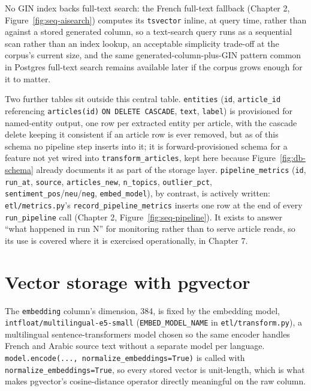 No GIN index backs full-text search: the French full-text fallback (Chapter 2, Figure~\ref{fig:seq-aisearch}) computes its \texttt{tsvector} inline, at query time, rather than against a stored generated column, so a text-search query runs as a sequential scan rather than an index lookup, an acceptable simplicity trade-off at the corpus's current size, and the same generated-column-plus-GIN pattern common in Postgres full-text search remains available later if the corpus grows enough for it to matter.

Two further tables sit outside this central table. \texttt{entities} (\texttt{id}, \texttt{article\_id} referencing \texttt{articles(id)} \texttt{ON DELETE CASCADE}, \texttt{text}, \texttt{label}) is provisioned for named-entity output, one row per extracted entity per article, with the cascade delete keeping it consistent if an article row is ever removed, but as of this schema no pipeline step inserts into it; it is forward-provisioned schema for a feature not yet wired into \texttt{transform\_articles}, kept here because Figure~\ref{fig:db-schema} already documents it as part of the storage layer. \texttt{pipeline\_metrics} (\texttt{id}, \texttt{run\_at}, \texttt{source}, \texttt{articles\_new}, \texttt{n\_topics}, \texttt{outlier\_pct}, \texttt{sentiment\_pos}\allowbreak/\allowbreak\texttt{neu}\allowbreak/\allowbreak\texttt{neg}, \texttt{embed\_model}), by contrast, is actively written: \texttt{etl/metrics.py}'s \texttt{record\_pipeline\_metrics} inserts one row at the end of every \texttt{run\_pipeline} call (Chapter 2, Figure~\ref{fig:seq-pipeline}). It exists to answer ``what happened in run N'' for monitoring rather than to serve article reads, so its use is covered where it is exercised operationally, in Chapter 7.

\section{Vector storage with pgvector}
\label{sec:pgvector}
The \texttt{embedding} column's dimension, 384, is fixed by the embedding model, \texttt{intfloat/\allowbreak multilingual-e5-small} (\texttt{EMBED\_MODEL\_NAME} in \texttt{etl/transform.py}), a multilingual sentence-transformers model chosen so the same encoder handles French and Arabic source text without a separate model per language. \texttt{model.encode(..., normalize\_embeddings=True)} is called with \texttt{normalize\_embeddings=True}, so every stored vector is unit-length, which is what makes pgvector's cosine-distance operator directly meaningful on the raw column.

